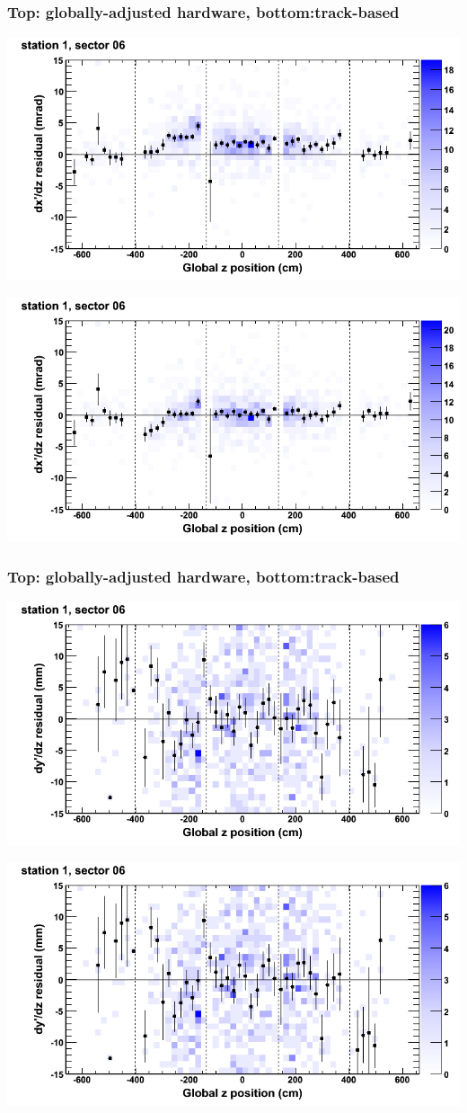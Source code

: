 \documentclass[compress]{beamer}
\begin{document}
\begin{frame}
\frametitle{Top: globally-adjusted hardware, bottom:track-based}
\includegraphics[width=0.7\linewidth]{NOV4_mapplots_HW/DTvsz_st1sec06_dxdz.png}

\includegraphics[width=0.7\linewidth]{NOV4_mapplots/DTvsz_st1sec06_dxdz.png}
\end{frame}

\begin{frame}
\frametitle{Top: globally-adjusted hardware, bottom:track-based}
\includegraphics[width=0.7\linewidth]{NOV4_mapplots_HW/DTvsz_st1sec06_dydz.png}

\includegraphics[width=0.7\linewidth]{NOV4_mapplots/DTvsz_st1sec06_dydz.png}
\end{frame}
\end{document}
